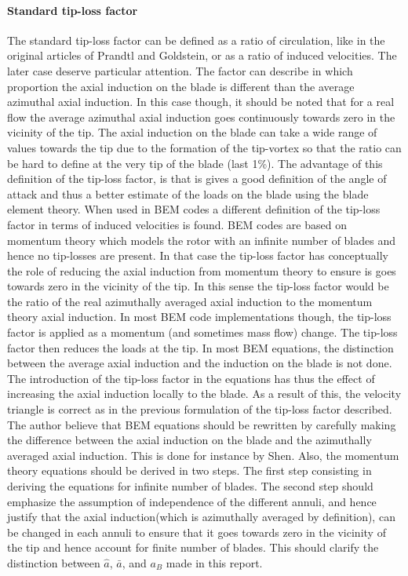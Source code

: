 \documentclass[a4paper,11pt]{book}
\begin{document}
\paragraph{Standard tip-loss factor} The standard tip-loss factor can be defined as a ratio of circulation, like in the original articles of Prandtl and Goldstein, or as a ratio of induced velocities. The later case deserve particular attention. The factor can describe in which proportion the axial induction on the blade is different than the average azimuthal axial induction. In this case though, it should be noted that for a real flow the average azimuthal axial induction goes continuously towards zero in the vicinity of the tip. The axial induction on the blade can take a wide range of values towards the tip due to the formation of the tip-vortex so that the ratio can be hard to define at the very tip of the blade (last 1\%). The advantage of this definition of the tip-loss factor, is that is gives a good definition of the angle of attack and thus a better estimate of the loads on the blade using the blade element theory.  When used in BEM codes a different definition of the tip-loss factor in terms of induced velocities is found. BEM codes are based on momentum theory which models the rotor with an infinite number of blades and hence no tip-losses are present. In that case the tip-loss factor has conceptually the role of reducing the axial induction from momentum theory to ensure is goes towards zero in the vicinity of the tip. In this sense the tip-loss factor would be the ratio of the real azimuthally averaged axial induction to the momentum theory axial induction. In most BEM code implementations though, the tip-loss factor is applied as a momentum (and sometimes mass flow) change. The tip-loss factor then reduces the loads at the tip. In most BEM equations, the distinction between the average axial induction and the induction on the blade is not done. The introduction of the tip-loss factor in the equations has thus the effect of increasing the axial induction locally to the blade. As a result of this, the velocity triangle is correct as in the previous formulation of the tip-loss factor described. The author believe that BEM equations should be rewritten by carefully making the difference between the axial induction on the blade and the azimuthally averaged axial induction. This is done for instance by Shen\cite{shen:2005}. Also, the momentum theory equations should be derived in two steps. The first step consisting in deriving the equations for infinite number of blades. The second step should emphasize the assumption of independence of the different annuli, and hence justify that the axial induction(which is azimuthally averaged by definition), can be changed in each annuli to ensure that it goes towards zero in the vicinity of the tip and hence account for finite number of blades. This should clarify the distinction between $\hat{a}$, $\bar{a}$, and $a_B$ made in this report.
\end{document}
